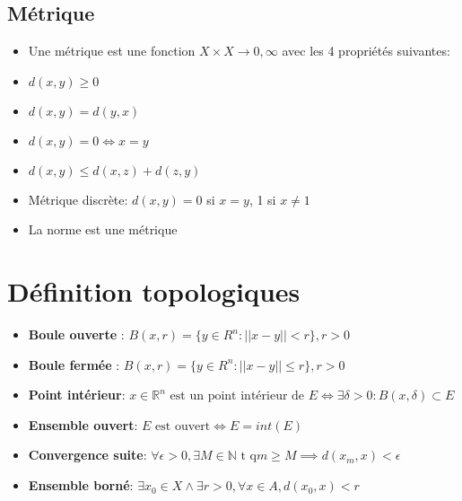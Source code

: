 \documentclass[12pt]{book}
\let\Bbb\mathbb
\theoremstyle{definition}
\begin{document}
\subsection{Métrique}
\begin{itemize}
    \item Une métrique est une fonction $X \times X \to 0, \infty$ avec les 4 propriétés suivantes:
    \item $d(x,y) \geq 0$
    \item $d(x,y) = d(y, x)$
    \item $d(x,y) = 0 \iff x = y$
    \item $d(x,y) \leq d(x, z) + d(z, y)$
    \item Métrique discrète: $d(x,y) = 0$ si $x = y$, 1 si $x \neq 1$
    \item La norme est une métrique
\end{itemize}
\section{Définition topologiques}
\begin{itemize}
    \item \textbf{Boule ouverte} : $B(x, r) = \{y \in R^n : || x - y || < r\}, r > 0$
    \item \textbf{Boule fermée} : $B(x, r) = \{y \in R^n : || x - y || \leq r\}, r > 0$
    \item \textbf{Point intérieur}: $x \in \Bbb R^n \text{ est un point intérieur de } E \iff \exists \delta > 0 : B(x, \delta) \subset E$
    \item \textbf{Ensemble ouvert}: $E\text{ est ouvert} \iff E = int(E)$
    \item \textbf{Convergence suite}: $\forall \epsilon > 0, \exists M \in \Bbb N \text{ t q} m \geq M \implies d(x_m, x) < \epsilon$
    \item \textbf{Ensemble borné}: $\exists x_0 \in X \land \exists r > 0, \forall x \in A, d(x_0, x) < r$
\end{itemize}
\end{document}
